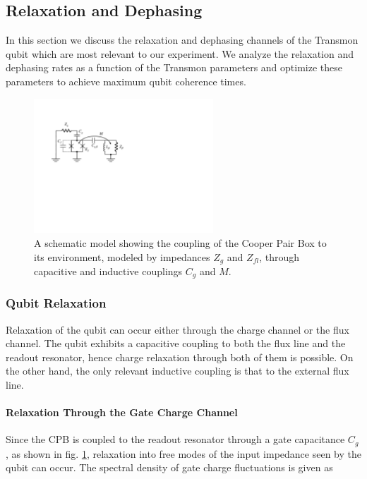 \subsection{Relaxation and Dephasing}

In this section we discuss the relaxation and dephasing channels of the Transmon qubit which are most relevant to our experiment. We analyze the relaxation and dephasing rates as a function of the Transmon parameters and optimize these parameters to achieve maximum qubit coherence times.

\begin{figure}
	\centering
	\includegraphics[width=0.6\textwidth]{./material/figures/introduction/cooper_pair_box_decoherence}
	\caption[]{A schematic model showing the coupling of the Cooper Pair Box to its environment, modeled by impedances $Z_g$ and $Z_{fl}$, through capacitive and inductive couplings $C_g$ and $M$.}
	\label{fig:cooper_pair_box_decoherence}
\end{figure}

\subsubsection{Qubit Relaxation}

Relaxation of the qubit can occur either through the charge channel or the flux channel. The qubit exhibits a capacitive coupling to both the flux line and the readout resonator, hence charge relaxation through both of them is possible. On the other hand, the only relevant inductive coupling is that to the external flux line.

\paragraph{Relaxation Through the Gate Charge Channel}

Since the CPB is coupled to the readout resonator through a gate capacitance $C_g$, as shown in fig. \ref{fig:cooper_pair_box_decoherence}, relaxation into free modes of the input impedance seen by the qubit can occur. The spectral density of gate charge fluctuations is given as

